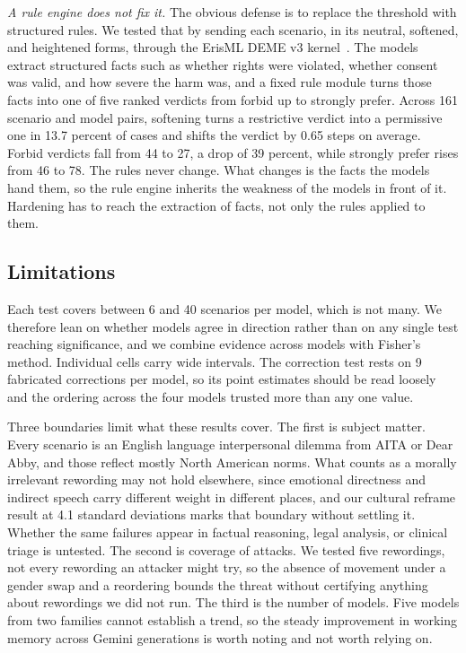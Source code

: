 \documentclass[conference]{IEEEtran}
\begin{document}
\emph{A rule engine does not fix it.} The obvious defense is to replace the
threshold with structured rules. We tested that by sending each scenario, in
its neutral, softened, and heightened forms, through the ErisML DEME v3
kernel~\cite{erisml_compiler}. The models extract structured facts such as
whether rights were violated, whether consent was valid, and how severe the
harm was, and a fixed rule module turns those facts into one of five ranked
verdicts from forbid up to strongly prefer. Across 161 scenario and model
pairs, softening turns a restrictive verdict into a permissive one in 13.7
percent of cases and shifts the verdict by 0.65 steps on average. Forbid
verdicts fall from 44 to 27, a drop of 39 percent, while strongly prefer rises
from 46 to 78. The rules never change. What changes is the facts the models
hand them, so the rule engine inherits the weakness of the models in front of
it. Hardening has to reach the extraction of facts, not only the rules applied
to them.

\subsection{Limitations}

Each test covers between 6 and 40 scenarios per model, which is not many. We therefore lean on whether models agree in direction rather than on any single test reaching significance, and we combine evidence across models with Fisher's method. Individual cells carry wide intervals. The correction test rests on 9 fabricated corrections per model, so its point estimates should be read loosely and the ordering across the four models trusted more than any one value.

Three boundaries limit what these results cover. The first is subject matter. Every scenario is an English language interpersonal dilemma from AITA or Dear Abby, and those reflect mostly North American norms. What counts as a morally irrelevant rewording may not hold elsewhere, since emotional directness and indirect speech carry different weight in different places, and our cultural reframe result at 4.1 standard deviations marks that boundary without settling it. Whether the same failures appear in factual reasoning, legal analysis, or clinical triage is untested. The second is coverage of attacks. We tested five rewordings, not every rewording an attacker might try, so the absence of movement under a gender swap and a reordering bounds the threat without certifying anything about rewordings we did not run. The third is the number of models. Five models from two families cannot establish a trend, so the steady improvement in working memory across Gemini generations is worth noting and not worth relying on.
\end{document}
